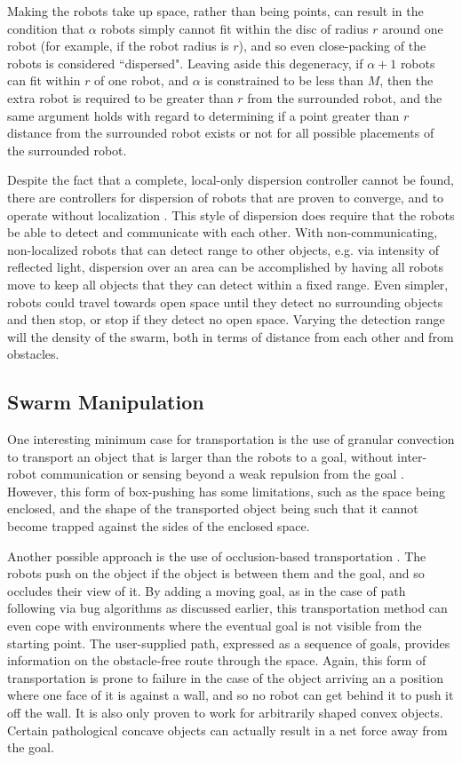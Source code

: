 Making the robots take up space, rather than being points, can result in the condition that $\alpha$ robots simply cannot fit within the disc of radius $r$ around one robot (for example, if the robot radius is $r$), and so even close-packing of the robots is considered ``dispersed".
Leaving aside this degeneracy, if $\alpha + 1$ robots can fit within $r$ of one robot, and $\alpha$ is constrained to be less than $M$, then the extra robot is required to be greater than $r$ from the surrounded robot, and the same argument holds with regard to determining if a point greater than $r$ distance from the surrounded robot exists or not for all possible placements of the surrounded robot.

Despite the fact that a complete, local-only dispersion controller cannot be found, there are controllers for dispersion of robots that are proven to converge, and to operate without localization \citep{correll2009ad}. 
This style of dispersion does require that the robots be able to detect and communicate with each other.
With non-communicating, non-localized robots that can detect range to other objects, e.g. via intensity of reflected light, dispersion over an area can be accomplished by having all robots move to keep all objects that they can detect within a fixed range.
Even simpler, robots could travel towards open space until they detect no surrounding objects and then stop, or stop if they detect no open space.  
Varying the detection range will the density of the swarm, both in terms of distance from each other and from obstacles. 

\subsection{Swarm Manipulation}

One interesting minimum case for transportation is the use of granular convection to transport an object that is larger than the robots to a goal, without inter-robot communication or sensing beyond a weak repulsion from the goal \citep{sugawara2014object}. 
However, this form of box-pushing has some limitations, such as the space being enclosed, and the shape of the transported object being such that it cannot become trapped against the sides of the enclosed space.

Another possible approach is the use of occlusion-based transportation \citep{chen2015occlusion}. 
The robots push on the object if the object is between them and the goal, and so occludes their view of it. 
By adding a moving goal, as in the case of path following via bug algorithms as discussed earlier, this transportation method can even cope with environments where the eventual goal is not visible from the starting point. 
The user-supplied path, expressed as a sequence of goals, provides information on the obstacle-free route through the space. 
Again, this form of transportation is prone to failure in the case of the object arriving an a position where one face of it is against a wall, and so no robot can get behind it to push it off the wall. 
It is also only proven to work for arbitrarily shaped convex objects. Certain pathological concave objects can actually result in a net force away from the goal. 

